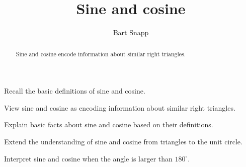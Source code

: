 \documentclass[handout,noauthor,nooutcomes,12pt,hints]{ximera}
\title{Sine and cosine}
\author{Bart Snapp}
\begin{document}
\begin{abstract}
  Sine and cosine encode information about similar right triangles.
\end{abstract}
\maketitle

\begin{listOutcomes}
\item Recall the basic definitions of sine and cosine.
\item View sine and cosine as encoding information about similar right
  triangles.
\item Explain basic facts about sine and cosine based on their
  definitions.
\item Extend the understanding of sine and cosine from triangles to
  the unit circle.
\item Interpret sine and cosine when the angle is larger than $180^\circ$.
\end{listOutcomes}
\mynewpage
\end{document}
